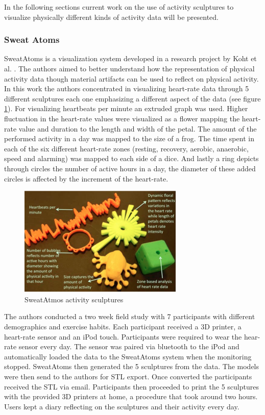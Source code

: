 \documentclass[../medieninformatik-arbeit.tex]{subfiles}
\begin{document}
In the following sections current work on the use of activity sculptures to visualize physically different kinds of activity data will be presented. 

\subsubsection{Sweat Atoms}
\label{sub:sweatatoms}
SweatAtoms is a visualization system developed in a research project by Koht et al. \cite{khot2014understanding}. The authors aimed to better understand how the representation of physical activity data though material artifacts can be used to reflect on physical activity. 
In this work the authors concentrated in visualizing heart-rate data through 5 different sculptures each one emphasizing a different aspect of the data (see figure \ref{fig:sweatatmos-as}). For visualizing heartbeats per minute an extruded graph was used. Higher fluctuation in the heart-rate values were visualized as a flower mapping the heart-rate value and duration to the length and width of the petal. The amount of the performed activity in a day was mapped to the size of a frog. The time spent in each of the six different heart-rate zones (resting, recovery, aerobic, anaerobic, speed and alarming) was mapped to each side of a dice. And lastly a ring depicts through circles the number of active hours in a day, the diameter of these added circles is affected by the increment of the heart-rate. 

\begin{figure}[ht]
\begin{center}
  \includegraphics[width=0.7\textwidth]{RelatedWork/img/sweatatoms-as}
  \caption{SweatAtmos activity sculptures \cite{khot2014understanding}}
\label{fig:sweatatmos-as}
\end{center}
\end{figure}

The authors conducted a two week field study with 7 participants with different demographics and exercise habits. Each participant received a 3D printer, a heart-rate sensor and an iPod touch. Participants were required to wear the hear-rate sensor every day. The sensor was paired via bluetooth to the iPod and automatically loaded the data to the SweatAtoms system when the monitoring stopped. SweatAtoms then generated the 5 sculptures from the data. The models were then send to the authors for STL export. Once converted the participants received the STL via email. Participants then proceeded to print the 5 sculptures with the provided 3D printers at home, a procedure that took around two hours. Users kept a diary reflecting on the sculptures and their activity every day. 
\end{document}
